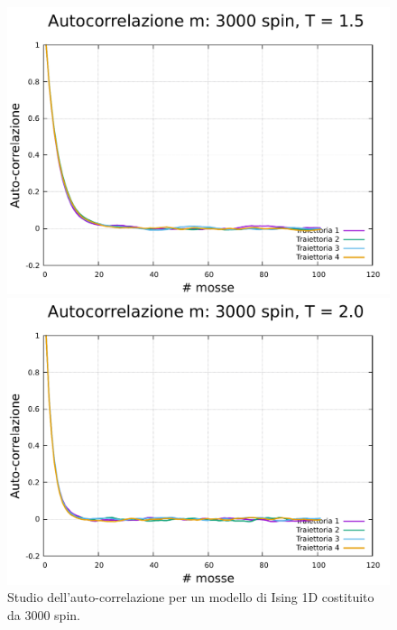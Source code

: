 \begin{figure}[htbp]
    \begin{minipage}{0.45\textwidth}  
      \centering
      \includegraphics[page=1, width=\textwidth]{Immagini/simIsing1D/magn0.0/tcorr/auto_3000_1.5.pdf}
      \caption{$T\,=\,1.5$}
    \end{minipage}\hfill
    \begin{minipage}{0.45\textwidth}  
      \centering
      \includegraphics[page=1, width=\textwidth]{Immagini/simIsing1D/magn0.0/tcorr/auto_3000_2.0.pdf}
      \caption{$T\,=\,2.0$}
    \end{minipage}
    \caption{Studio dell'auto-correlazione per un modello di Ising 1D costituito da 3000 spin.}
\end{figure}

